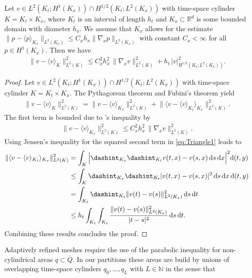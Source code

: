 \documentclass{amsart}
\providecommand{\dx}{\,\mathrm{d}x}
\providecommand{\dt}{\,\mathrm{d}t}
\providecommand{\ds}{\,\mathrm{d}s}
\begin{document}
%
\begin{lemma}\label{lem:ParaPoincareH12}
Let $v\in L^2(K_t;H^1(K_x))\cap H^{1/2}(K_t;L^2(K_x))$ with time-space cylinder $K = K_t \times K_x$, where $K_t$ is an interval of length $h_t$ and $K_x \subset \mathbb{R}^d$ is some bounded domain with diameter $h_x$. We assume that $K_x$ allows for the \Poincare{} estimate $\lVert p - \langle p \rangle_{K_x}\rVert_{L^2(K_x)} \leq C_x h_x \lVert \nabla_x p \rVert_{L^2(K_x)}$ with constant $C_x < \infty$  for all $p\in H^1(K_x)$. Then we have
\begin{align*}
\lVert v - \langle v \rangle_K \rVert^2 _{L^2(K)}\leq C_x^2  h^2_x\, \lVert \nabla_x v \rVert^2_{L^2(K)} + h_t\, \lvert v \rvert^2_{H^{1/2}(K_t;L^2(K_x))}.
\end{align*}
\end{lemma}
\begin{proof}
Let $v\in L^2(K_t;H^1(K_x))\cap H^{1/2}(K_t;L^2(K_x))$ with time-space cylinder $K=K_t\times K_x$. The Pythagorean theorem and Fubini's theorem yield
\begin{align}\label{eq:Triangle1}
\lVert v - \langle v \rangle_K \rVert_{L^2(K)}^2 = \lVert v - \langle v \rangle_{K_x} \rVert_{L^2(K)}^2 
+ \lVert \langle v - \langle v \rangle_{K_t} \rangle_{K_x}\rVert^2_{L^2(K)}.
\end{align}
The first term is bounded due to \Poincare's inequality by 
\begin{align*}
\lVert v - \langle v \rangle_{K_x} \rVert^2_{L^2(K)} \leq C_x^2 h^2_x\, \lVert \nabla_x v \rVert_{L^2(K)}^2.
\end{align*}
Using Jensen's inequality for the squared second term in \eqref{eq:Triangle1} leads to 
\begin{align*}
 \lVert \langle v - \langle v \rangle_{K_t} \rangle_{K_x}\rVert^2_{L^2(K)} & = \int_K \Big|\dashint_{K_x} \dashint_{K_t} v(t,x) - v(s,x) \ds\dx\Big|^2 \mathrm{d}(t,y)\\
 & \leq \int_K  \dashint_{K_x} \dashint_{K_t} |v(t,x) - v(s,x)|^2 \ds\dx\, \mathrm{d}(t,y)\\
& = \int_{K_t} \dashint_{K_t} \lVert v(t) - v(s)\rVert_{L^2(K_x)}^2 \ds\dt\\
 &\leq h_t \int_{K_t} \int_{K_t} \frac{\lVert v(t) - v(s)\rVert_{L^2(K_x)}^2}{|t-s|^2} \ds\dt.
\end{align*}
Combining these results concludes the proof.
\end{proof}
Adaptively refined meshes require the use of the parabolic \Poincare{} inequality for non-cylindrical areas $q \subset \overline{Q}$. In our partitions these areas are build by unions of overlapping time-space cylinders $q_0,\dots,q_L$ with $L\in \mathbb{N}$ in the sense that
\end{document}
